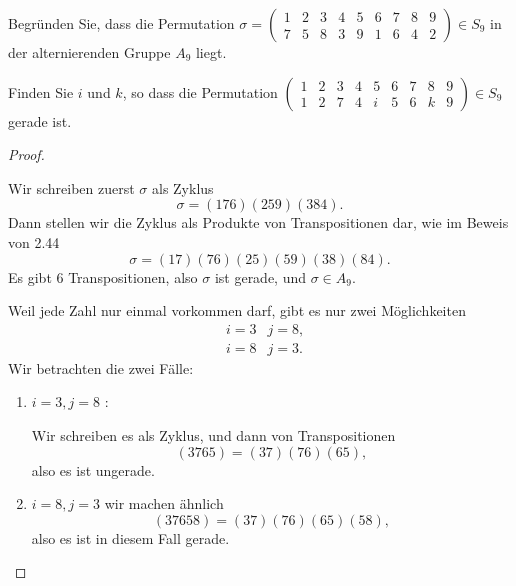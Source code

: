 \begin{Problem}
	\begin{parts}
		\item Begr\"{u}nden Sie, dass die Permutation $\sigma=\begin{pmatrix} 1 & 2 & 3 & 4 & 5 & 6 & 7 & 8 & 9 \\ 7 & 5 & 8 & 3 & 9 & 1 & 6 & 4 & 2 \end{pmatrix} \in S_9$ in der alternierenden Gruppe $A_9$ liegt.
		\item Finden Sie $i$ und $k$, so dass die Permutation $\begin{pmatrix}  1 & 2 & 3 & 4 & 5 & 6 & 7 & 8 & 9\\ 1 & 2 & 7 & 4 & i & 5 & 6 & k & 9 \end{pmatrix} \in S_9$ gerade ist.
		\end{parts}
\end{Problem}

\begin{proof}
	\begin{parts}
	\item Wir schreiben zuerst $\sigma$ als Zyklus
	\[
	\sigma=(176)(259)(384)
	.\] 
	Dann stellen wir die Zyklus als Produkte von Transpositionen dar, wie im Beweis von 2.44
	\[
	\sigma=(17)(76)(25)(59)(38)(84)
	.\]
	Es gibt $6$ Transpositionen, also $\sigma$ ist gerade, und $\sigma\in A_9$.
\item Weil jede Zahl nur einmal vorkommen darf, gibt es nur zwei M\"{o}glichkeiten
	\begin{align*}
	& i=3 & j=8,\\
	& i=8 & j =3.
	\end{align*} 
	Wir betrachten die zwei F\"{a}lle:
	\begin{enumerate}[label=(\roman*)]
		\item $i=3, j=8$ :

			Wir schreiben es als Zyklus, und dann von Transpositionen
			\[
				(3765)=(37)(76)(65)
			,\]
			also es ist ungerade.
		\item $i=8,j=3$ wir machen ähnlich
			\[
				(37658)=(37)(76)(65)(58)
			,\] 
			also es ist in diesem Fall gerade.\qedhere
	\end{enumerate}
\end{parts}
\end{proof}

